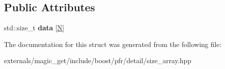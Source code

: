 \subsection*{Public Attributes}
\begin{DoxyCompactItemize}
\item 
\mbox{\label{structboost_1_1pfr_1_1detail_1_1size__array_a10040595548f7ddff023e074c41d8749}} 
std\+::size\+\_\+t {\bfseries data} \mbox{[}\mbox{\hyperlink{group__types_gaf9c1edb0e0da55ec6ba09f32f6839529}{N}}\mbox{]}
\end{DoxyCompactItemize}


The documentation for this struct was generated from the following file\+:\begin{DoxyCompactItemize}
\item 
externals/magic\+\_\+get/include/boost/pfr/detail/size\+\_\+array.\+hpp\end{DoxyCompactItemize}
